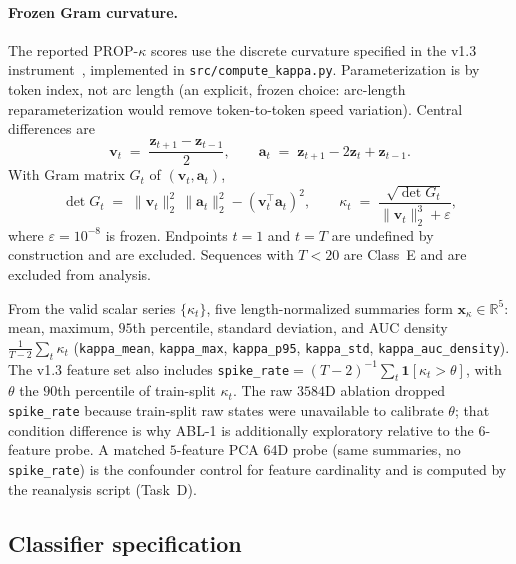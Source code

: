 \documentclass{article}
\newcommand{\propk}{\mathrm{PROP}\text{-}\kappa}
\begin{document}
\paragraph{Frozen Gram curvature.}
The reported $\propk$ scores use the discrete curvature specified in the v1.3 instrument~\citep{exptrj001planv13}, implemented in \texttt{src/compute\_kappa.py}. Parameterization is by token index, not arc length (an explicit, frozen choice: arc-length reparameterization would remove token-to-token speed variation). Central differences are
\begin{equation}
  \mathbf{v}_t
  \;=\;
  \frac{\mathbf{z}_{t+1}-\mathbf{z}_{t-1}}{2},
  \qquad
  \mathbf{a}_t
  \;=\;
  \mathbf{z}_{t+1}-2\mathbf{z}_t+\mathbf{z}_{t-1}.
\label{eq:va}
\end{equation}
With Gram matrix $G_t$ of $(\mathbf{v}_t,\mathbf{a}_t)$,
\begin{equation}
  \det G_t
  \;=\;
  \lVert\mathbf{v}_t\rVert_2^2\,\lVert\mathbf{a}_t\rVert_2^2
  -(\mathbf{v}_t^{\top}\mathbf{a}_t)^2,
  \qquad
  \kappa_t
  \;=\;
  \frac{\sqrt{\det G_t}}{\lVert\mathbf{v}_t\rVert_2^3+\varepsilon},
\label{eq:kappa-curv}
\end{equation}
where $\varepsilon=10^{-8}$ is frozen. Endpoints $t=1$ and $t=T$ are undefined by construction and are excluded. Sequences with $T<20$ are Class~E and are excluded from analysis.

From the valid scalar series $\{\kappa_t\}$, five length-normalized summaries form $\mathbf{x}_{\kappa}\in\mathbb{R}^{5}$:
mean, maximum, $95$th percentile, standard deviation, and {AUC} density $\frac{1}{T-2}\sum_t \kappa_t$
(\texttt{kappa\_mean}, \texttt{kappa\_max}, \texttt{kappa\_p95}, \texttt{kappa\_std}, \texttt{kappa\_auc\_density}).
The v1.3 feature set also includes \texttt{spike\_rate}$=(T-2)^{-1}\sum_t \mathbf{1}[\kappa_t>\theta]$, with $\theta$ the $90$th percentile of train-split $\kappa_t$. The raw $3584${D} ablation dropped \texttt{spike\_rate} because train-split raw states were unavailable to calibrate $\theta$; that condition difference is why {ABL-1} is additionally exploratory relative to the $6$-feature probe. A matched $5$-feature {PCA} $64${D} probe (same summaries, no \texttt{spike\_rate}) is the confounder control for feature cardinality and is computed by the reanalysis script (Task~D).

\subsection{Classifier specification}
\label{sec:clf}
\end{document}
